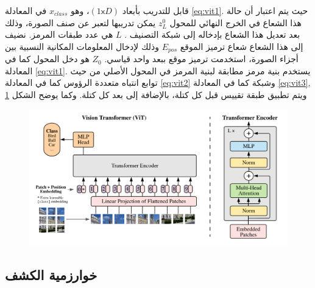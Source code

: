 قابل للتدريب بأبعاد
$(1\mathsf{x}D)$،
وهو 
$x_{class}$
في المعادلة 
\ref{eq:vit1}.
 حيث يتم اعتبار أن حالة هذا الشعاع في الخرج النهائي للمحول
$z_L^0$
يمكن تدريبها لتعبر عن صنف الصورة، وذلك بعد تعديل هذا الشعاع بإدخاله إلى شبكة التصنيف
.
$L$
هي عدد طبقات المرمز.
\newline
نضيف إلى هذا الشعاع شعاع ترميز الموقع 
$E_{pos}$
وذلك لإدخال المعلومات المكانية النسبية بين أجزاء الصورة، استخدمت
ترميز موقع ببعد واحد قياسي.
$Z_0$
هو دخل المحول كما في المعادلة
\ref{eq:vit1}.
\newline
يستخدم
بنية مرمز مطابقة لبنية المرمز في المحول الأصلي من حيث توابع انتباه متعددة الرؤوس كما في المعادلة 
\ref{eq:vit2}
وشبكة
كما في المعادلة 
\ref{eq:vit3},
ويتم تطبيق طبقة تقييس قبل كل كتلة، بالإضافة إلى 
بعد كل كتلة. وكما يوضح الشكل
\ref{fig:ViT}

\begin{figure}[h!]
	\centerline{\includegraphics[width=\textwidth]{images/ViT}}
	\caption{
	}
	\label{fig:ViT}
\end{figure}

\subsection{خوارزمية الكشف
\label{section:detr}}

